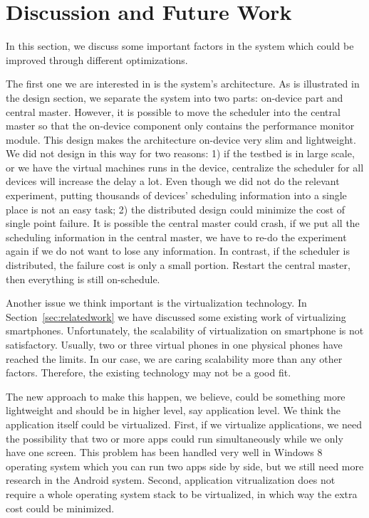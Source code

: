 \section{Discussion and Future Work}\label{sec:discussion}
In this section, we discuss some important factors in the system which could be improved through different optimizations.

The first one we are interested in is the system's architecture. As is illustrated in the design section, we separate the system into two parts: on-device part and central master. However, it is possible to move the scheduler into the central master so that the on-device component only contains the performance monitor module. This design makes the architecture on-device very slim and lightweight. We did not design in this way for two reasons: 1) if the testbed is in large scale, or we have the virtual machines runs in the device, centralize the scheduler for all devices will increase the delay a lot. Even though we did not do the relevant experiment, putting thousands of devices' scheduling information into a single place is not an easy task; 2) the distributed design could minimize the cost of single point failure. It is possible the central master could crash, if we put all the scheduling information in the central master, we have to re-do the experiment again if we do not want to lose any information. In contrast, if the scheduler is distributed, the failure cost is only a small portion. Restart the central master, then everything is still on-schedule.

Another issue we think important is the virtualization technology. In Section~\ref{sec:relatedwork} we have discussed some existing work of virtualizing smartphones. Unfortunately, the scalability of virtualization on smartphone is not satisfactory. Usually, two or three virtual phones in one physical phones have reached the limits. In our case, we are caring scalability more than any other factors. Therefore, the existing technology may not be a good fit.

The new approach to make this happen, we believe, could be something more lightweight and should be in higher level, say application level. We think the application itself could be virtualized. First, if we virtualize applications, we need the possibility that two or more apps could run simultaneously while we only have one screen. This problem has been handled very well in Windows 8 operating system which you can run two apps side by side, but we still need more research in the Android system. Second, application vitrualization does not require a whole operating system stack to be virtualized, in which way the extra cost could be minimized.
